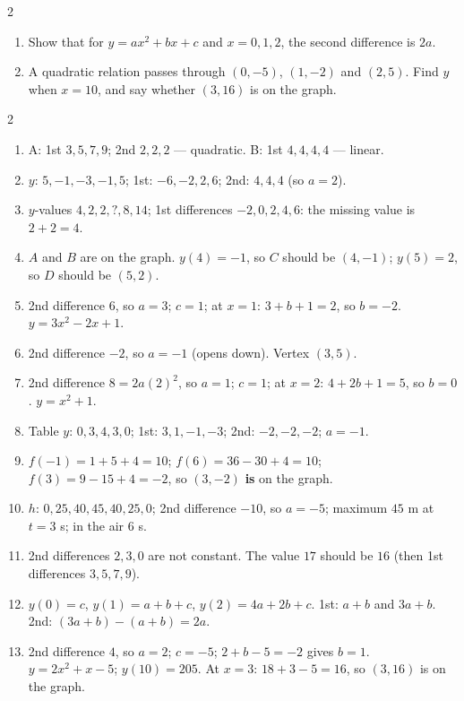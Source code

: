 \documentclass[11pt]{article}
\begin{document}
\begin{recapbox}
\begin{multicols}{2}
\begin{enumerate}[leftmargin=*,itemsep=3pt]
\begin{center}
\begin{tabular}
\end{tabular}\end{center}
  \item Show that for $y=ax^2+bx+c$ and $x=0,1,2$, the second difference is $2a$.
  \item A quadratic relation passes through $(0,-5)$, $(1,-2)$ and $(2,5)$. Find $y$ when $x=10$, and say whether $(3,16)$ is on the graph.
\end{enumerate}
\end{multicols}
\end{recapbox}

\begin{keybox}
\begin{multicols}{2}
\small
\begin{enumerate}[leftmargin=*,itemsep=3pt]
  \item A: 1st $3,5,7,9$; 2nd $2,2,2$ --- quadratic. B: 1st $4,4,4,4$ --- linear.
  \item $y$: $5,-1,-3,-1,5$; 1st: $-6,-2,2,6$; 2nd: $4,4,4$ (so $a=2$).
  \item $y$-values $4,2,2,?,8,14$; 1st differences $-2,0,2,4,6$: the missing value is $2+2=4$.
  \item $A$ and $B$ are on the graph. $y(4)=-1$, so $C$ should be $(4,-1)$; $y(5)=2$, so $D$ should be $(5,2)$.
  \item 2nd difference $6$, so $a=3$; $c=1$; at $x=1$: $3+b+1=2$, so $b=-2$. $y=3x^2-2x+1$.
  \item 2nd difference $-2$, so $a=-1$ (opens down). Vertex $(3,5)$.
  \item 2nd difference $8=2a(2)^2$, so $a=1$; $c=1$; at $x=2$: $4+2b+1=5$, so $b=0$. $y=x^2+1$.
  \item Table $y$: $0,3,4,3,0$; 1st: $3,1,-1,-3$; 2nd: $-2,-2,-2$; $a=-1$.
  \item $f(-1)=1+5+4=10$; $f(6)=36-30+4=10$; $f(3)=9-15+4=-2$, so $(3,-2)$ \textbf{is} on the graph.
  \item $h$: $0,25,40,45,40,25,0$; 2nd difference $-10$, so $a=-5$; maximum $45$ m at $t=3$ s; in the air $6$ s.
  \item 2nd differences $2,3,0$ are not constant. The value $17$ should be $16$ (then 1st differences $3,5,7,9$).
  \item $y(0)=c$, $y(1)=a+b+c$, $y(2)=4a+2b+c$. 1st: $a+b$ and $3a+b$. 2nd: $(3a+b)-(a+b)=2a$.
  \item 2nd difference $4$, so $a=2$; $c=-5$; $2+b-5=-2$ gives $b=1$. $y=2x^2+x-5$; $y(10)=205$. At $x=3$: $18+3-5=16$, so $(3,16)$ is on the graph.
\end{enumerate}
\end{multicols}
\end{keybox}
\end{document}

